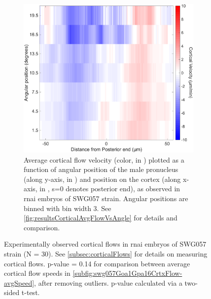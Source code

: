 \begin{figure}
\begin{subfigure}[t]{0.3\textwidth}
    \includegraphics[width=\textwidth]{Results/FigExpGoa1Gpa16/goa1gpa16_corticalflow_angleFig.pdf}
    \caption{Average cortical flow velocity (color, in \si{\unitCrtxVel}) plotted as a function of angular position of the male pronucleus (along y-axis, in \si{\unitAngle}) and position on the cortex (along x-axis, in \si{\unitLength}, s=\SI{0}{\unitLength} denotes posterior end), as observed in  \ac{rnai} embryos of SWG057 strain. Angular positions are binned with bin width \SI{3}{\unitAngle}. See \autoref{fig:resultsCorticalAvgFlowVsAngle} for details and comparison.} 
    \label{subfig:swg057Goa1Gpa16CrtxFlow-VsAngle}
\end{subfigure}
\caption[Experimentally observed cortical flows in  \acs{rnai} SWG057 embryos]{Experimentally observed cortical flows in  \ac{rnai} embryos of SWG057 strain (N = 30). See \autoref{subsec:corticalFlows} for details on measuring cortical flows. p-value = \num{0.14} for comparison between average cortical flow speeds in \autoref{subfig:swg057Goa1Gpa16CrtxFlow-avgSpeed}, after removing outliers. p-value calculated via a two-sided t-test.}
\label{fig:swg057Goa1Gpa16CrtxFlow}
\end{figure}

